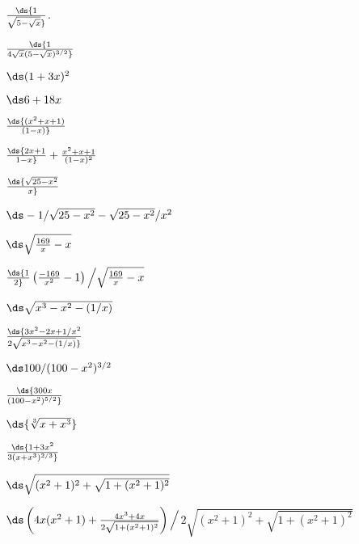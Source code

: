 \begin{enumialphparenastyle}
\begin{ex}  $\ds {1\over\sqrt{5-\sqrt{x}}}$.
\begin{sol} 
$\ds{1\over 4\sqrt{x}(5-\sqrt{x})^{3/2}}$
\end{sol}
\end{ex}

\begin{ex}  $\ds (1+3x)^2$
\begin{sol} 
$\ds  6+18x$
\end{sol}
\end{ex}

\begin{ex}  $\ds{(x^2+x+1)\over(1-x)}$
\begin{sol} 
$\ds {2 x + 1\over1 - x }+{x^2  + x + 1\over(1 - x)^2}$
\end{sol}
\end{ex}

\begin{ex}  $\ds{\sqrt{25-x^2}\over x}$
\begin{sol} 
$\ds  -1/\sqrt{25-x^2}-\sqrt{25-x^2}/x^2$
\end{sol}
\end{ex}

\begin{ex}  $\ds\sqrt{{169\over x}-x}$
\begin{sol} 
$\ds{1\over2}\left({-169\over x^2}-1\right)\Big/\sqrt{{169\over x}-x}$
\end{sol}
\end{ex}

\begin{ex}  $\ds \sqrt{x^3-x^2-(1/x)}$
\begin{sol} 
$ \ds{3x^2-2x+1/x^2\over 2\sqrt{x^3-x^2-(1/x)}}$
\end{sol}
\end{ex}

\begin{ex}  $\ds 100/(100-x^2)^{3/2}$
\begin{sol} 
$ \ds{300 x \over(100-x^2)^{5/2}}$
\end{sol}
\end{ex}

\begin{ex}  $\ds {\root 3 \of{x+x^3}}$
\begin{sol} 
$ \ds{ 1 + 3 x^2\over3(x+x^3)^{2/3}}$
\end{sol}
\end{ex}

\begin{ex}  $\ds \sqrt{(x^2+1)^2+\sqrt{1+(x^2+1)^2}}$
\begin{sol} 
$\ds \left(4x(x^2+1)+{4x^3+4x\over2\sqrt{1+(x^2+1)^2}}\right)\Big/$\hfill\break$2\sqrt{(x^2+1)^2+\sqrt{1+(x^2+1)^2}}$
\end{sol}
\end{ex}


\end{enumialphparenastyle}
